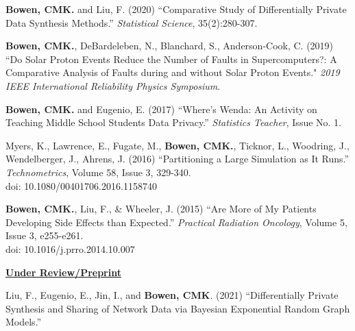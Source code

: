 \documentclass[11pt, letterpaper, roman]{moderncv} %
\begin{document}
\begin{etaremune}[topsep=0pt, itemsep=4pt, partopsep=0pt, parsep=0pt]
    \item \textbf{Bowen, CMK.} and Liu, F. (2020) ``Comparative Study of Differentially Private Data Synthesis Methods.'' \textit{Statistical Science}, 35(2):280-307.

    \item \textbf{Bowen, CMK.}, DeBardeleben, N., Blanchard, S., Anderson-Cook, C. (2019) ``Do Solar Proton Events Reduce the Number of Faults in Supercomputers?: A Comparative Analysis of Faults during and without Solar Proton Events." \textit{2019 IEEE International Reliability Physics Symposium}.

    \item \textbf{Bowen, CMK.} and Eugenio, E. (2017) ``Where's Wenda:  An Activity on Teaching Middle School Students Data Privacy.'' \textit{Statistics Teacher}, Issue No. 1.
    
    \item Myers, K., Lawrence, E., Fugate, M., \textbf{Bowen, CMK.}, Ticknor, L., Woodring, J., Wendelberger, J., Ahrens, J. (2016) ``Partitioning a Large Simulation as It Runs.'' \textit{Technometrics}, Volume 58, Issue 3, 329-340. \\
    doi: 10.1080/00401706.2016.1158740

    \item \textbf{Bowen, CMK.}, Liu, F., \& Wheeler, J. (2015) ``Are More of My Patients Developing Side Effects than Expected.'' \textit{Practical Radiation Oncology}, Volume 5, Issue 3, e255-e261.\\
    doi: 10.1016/j.prro.2014.10.007
\end{etaremune}

\vspace{4pt}
\noindent\underline{\textbf{Under Review/Preprint}}
\begin{etaremune}
    \item Liu, F., Eugenio, E., Jin, I., and \textbf{Bowen, CMK}. (2021) ``Differentially Private Synthesis and Sharing of Network Data via Bayesian Exponential Random Graph Models.''
\end{etaremune}
\end{document}
